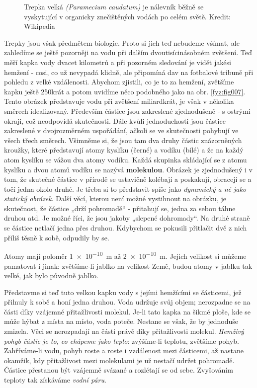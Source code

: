     \begin{figure}[ht!]  %
      \centering
      \caption{ Trepka velká \emph{(Paramecium caudatum)} je nálevník běžně se vyskytující v 
                organicky znečištěných vodách po celém světě. Kredit: Wikipedia}
      \label{fyz:fig890}
    \end{figure} 

    Trepky jsou však předmětem biologie. Proto si jich teď nebudeme všímat, ale zahledíme se ještě
    pozorněji na vodu při dalším dvoutisícinásobném zvětšení. Teď měří kapka vody dvacet kilometrů a
    při pozorném sledování je vidět jakési hemžení - cosi, co už nevypadá klidně, ale připomíná dav
    na fotbalové tribuně při pohledu z velké vzdálenosti. Abychom zjistili, co je to za hemžení,
    zvětšíme kapku ještě 250krát a potom uvidíme něco podobného jako na obr. \ref{fyz:fig007}. Tento
    obrázek představuje vodu při zvětšení miliardkrát, je však v několika směrech idealizovaný.
    Především částice jsou zakreslené zjednodušeně - s ostrými okraji, což neodpovídá skutečnosti.
    Dále kvůli jednoduchosti jsou částice zakreslené v dvojrozměrném uspořádání, ačkoli se ve
    skutečnosti pohybují ve všech třech směrech. Všimněme si, že jsou tam dva druhy částic
    znázorněných kroužky, které představují atomy kyslíku (černé) a vodíku (bílé) a že na každý atom
    kyslíku se vážou dva atomy vodíku. Každá skupinka skládající se z atomu kyslíku a dvou atomů
    vodíku se nazývá \textbf{molekulou}. Obrázek je zjednodušený i v tom, že skutečné částice v
    přírodě se ustavičně kolébají a poskakují, obracejí se a točí jedna okolo druhé. Je třeba si to
    představit spíše jako \emph{dynamický a né jako statický obrázek}. Další věcí, kterou není možné
    vystihnout na obrázku, je skutečnost, že částice „drží pohromadě“ - přitahují se, jedna za sebou
    táhne druhou atd. Je možné říci, že jsou jakoby „slepené dohromady“. Na druhé straně se částice
    netlačí jedna přes druhou. Kdybychom se pokusili přitlačit dvě z nich příliš těsně k sobě,
    odpudily by se.

    Atomy mají poloměr \SI{1e-10}{\m} až \SI{2e-10}{\m}. Jejich velikost si můžeme pamatovat i
    jinak: zvětšíme-li jablko na velikost Země, budou atomy v jablku tak velké, jak bylo původně
    jablko.

    Představme si teď tuto velkou kapku vody s jejími hemžícími se částicemi, jež přilnuly k sobě a
    honí jedna druhou. Voda udržuje svůj objem; nerozpadne se na části díky vzájemné přitažlivosti
    molekul. Je-li tato kapka na šikmé ploše, kde se může hýbat z místa na místo, voda poteče.
    Nestane se však, že by jednoduše zmizela. Věci se nerozpadají na části právě díky přitažlivosti
    molekul. \emph{Hemživý pohyb částic je to, co chápeme jako teplo}: zvýšíme-li teplotu, zvětšíme
    pohyb. Zahříváme-li vodu, pohyb roste a roste i vzdálenost mezi částicemi, až nastane okamžik,
    kdy přitažlivost mezi molekulami je už nestačí udržet pohromadě. Částice přestanou být vzájemně
    svázané a rozlétají se od sebe. Zvyšováním teploty tak získáváme \emph{vodní páru}.  
    
